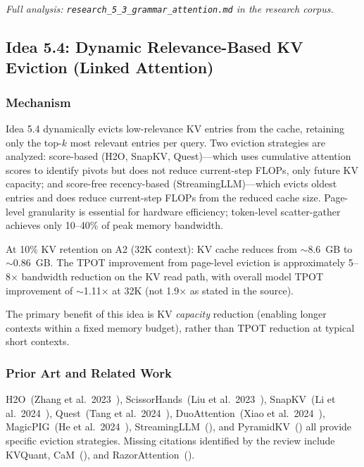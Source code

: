 \documentclass[11pt]{article}
\begin{document}
\par\noindent\textit{Full analysis: \texttt{research\_5\_3\_grammar\_attention.md} in the research corpus.}


\subsection{Idea 5.4: Dynamic Relevance-Based KV Eviction (Linked Attention)}
\label{subsec:idea54}

\subsubsection*{Mechanism}

Idea 5.4 dynamically evicts low-relevance KV entries from the cache, retaining only the top-$k$ most relevant entries per query. Two eviction strategies are analyzed: score-based (H2O, SnapKV, Quest)---which uses cumulative attention scores to identify pivots but does not reduce current-step FLOPs, only future KV capacity; and score-free recency-based (StreamingLLM)---which evicts oldest entries and does reduce current-step FLOPs from the reduced cache size. Page-level granularity is essential for hardware efficiency; token-level scatter-gather achieves only 10--40\% of peak memory bandwidth.

At 10\% KV retention on A2 (32K context): KV cache reduces from $\sim$8.6~GB to $\sim$0.86~GB. The TPOT improvement from page-level eviction is approximately 5--8$\times$ bandwidth reduction on the KV read path, with overall model TPOT improvement of $\sim$1.11$\times$ at 32K (not 1.9$\times$ as stated in the source).

The primary benefit of this idea is KV \emph{capacity} reduction (enabling longer contexts within a fixed memory budget), rather than TPOT reduction at typical short contexts.

\subsubsection*{Prior Art and Related Work}

H2O~(Zhang et al.\ 2023~\cite{ZhangH2O2023}), ScissorHands~(Liu et al.\ 2023~\cite{LiuScissorHands2023b}), SnapKV~(Li et al.\ 2024~\cite{LiSnapKV2024}), Quest~(Tang et al.\ 2024~\cite{TangQuest2024}), DuoAttention~(Xiao et al.\ 2024~\cite{XiaoDuoAttention2024}), MagicPIG~(He et al.\ 2024~\cite{HeMagicPIG2024}), StreamingLLM~(\cite{XiaoStreamingLLM2023}), and PyramidKV~(\cite{PyramidKV2024}) all provide specific eviction strategies. Missing citations identified by the review include KVQuant, CaM~(\cite{CaM2024}), and RazorAttention~(\cite{RazorAttention2024}).
\end{document}
